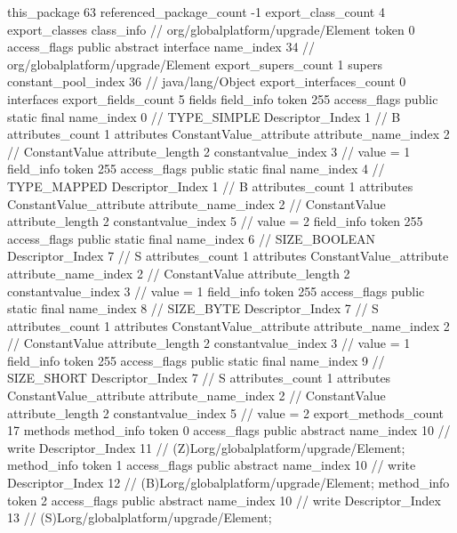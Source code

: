 {{{		}
	}
	this_package	63
	referenced_package_count	-1
	export_class_count	4
	export_classes {
		class_info {		// org/globalplatform/upgrade/Element
			token	0
			access_flags	public abstract interface
			name_index	34		// org/globalplatform/upgrade/Element
			export_supers_count	1
			supers {
				constant_pool_index	36		// java/lang/Object
			}
			export_interfaces_count	0
			interfaces {
			}
			export_fields_count	5
			fields {
			field_info {
				token	255
				access_flags	public static final
				name_index	0		// TYPE_SIMPLE
				Descriptor_Index	1		// B
				attributes_count	1
				attributes {
				ConstantValue_attribute {
					attribute_name_index	2		// ConstantValue
					attribute_length	2
					constantvalue_index	3		// value = 1
				}
				}
			}
			field_info {
				token	255
				access_flags	public static final
				name_index	4		// TYPE_MAPPED
				Descriptor_Index	1		// B
				attributes_count	1
				attributes {
				ConstantValue_attribute {
					attribute_name_index	2		// ConstantValue
					attribute_length	2
					constantvalue_index	5		// value = 2
				}
				}
			}
			field_info {
				token	255
				access_flags	public static final
				name_index	6		// SIZE_BOOLEAN
				Descriptor_Index	7		// S
				attributes_count	1
				attributes {
				ConstantValue_attribute {
					attribute_name_index	2		// ConstantValue
					attribute_length	2
					constantvalue_index	3		// value = 1
				}
				}
			}
			field_info {
				token	255
				access_flags	public static final
				name_index	8		// SIZE_BYTE
				Descriptor_Index	7		// S
				attributes_count	1
				attributes {
				ConstantValue_attribute {
					attribute_name_index	2		// ConstantValue
					attribute_length	2
					constantvalue_index	3		// value = 1
				}
				}
			}
			field_info {
				token	255
				access_flags	public static final
				name_index	9		// SIZE_SHORT
				Descriptor_Index	7		// S
				attributes_count	1
				attributes {
				ConstantValue_attribute {
					attribute_name_index	2		// ConstantValue
					attribute_length	2
					constantvalue_index	5		// value = 2
				}
				}
			}
			}
			export_methods_count	17
			methods {
				method_info {
					token	0
					access_flags	public abstract
					name_index	10		// write
					Descriptor_Index	11		// (Z)Lorg/globalplatform/upgrade/Element;
				}
				method_info {
					token	1
					access_flags	public abstract
					name_index	10		// write
					Descriptor_Index	12		// (B)Lorg/globalplatform/upgrade/Element;
				}
				method_info {
					token	2
					access_flags	public abstract
					name_index	10		// write
					Descriptor_Index	13		// (S)Lorg/globalplatform/upgrade/Element;
}}}}}
